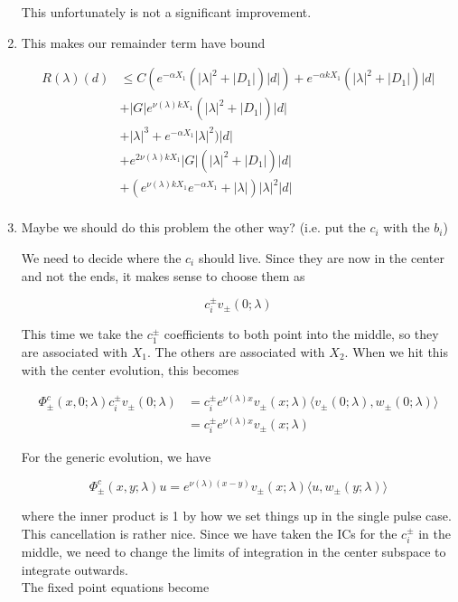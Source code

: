 \documentclass[12pt]{article}
\begin{document}
\begin{enumerate}
This unfortunately is not a significant improvement.


\item This makes our remainder term have bound

\begin{align*}
R(\lambda)(d) &\leq C( e^{-\alpha X_1}( |\lambda|^2 + |D_1|)|d|) + e^{-\alpha k X_1} ( |\lambda|^2 + |D_1|) |d| \\
&+ |G| e^{\nu(\lambda)k X_1} ( |\lambda|^2 + |D_1| )|d| \\ 
&+ |\lambda|^3 + e^{-\alpha X_1} |\lambda|^2 )|d| \\
&+ e^{2 \nu(\lambda) k X_1} |G| ( |\lambda|^2 + |D_1| )|d| \\
&+ (e^{\nu(\lambda)k X_1} e^{-\alpha X_1} + |\lambda|)|\lambda|^2|d|\\
\end{align*}

\item Maybe we should do this problem the other way? (i.e. put the $c_i$ with the $b_i$)

We need to decide where the $c_i$ should live. Since they are now in the center and not the ends, it makes sense to choose them as 

\[
c_i^\pm v_\pm(0; \lambda)
\]

This time we take the $c_1^\pm$ coefficients to both point into the middle, so they are associated with $X_1$. The others are associated with $X_2$. When we hit this with the center evolution, this becomes

\begin{align*}
\Phi^c_\pm(x,0; \lambda)c_i^\pm v_\pm(0; \lambda) &= c_i^\pm e^{\nu(\lambda)x} v_\pm(x; \lambda) \langle v_\pm(0; \lambda), w_\pm(0; \lambda) \rangle \\
&= c_i^\pm e^{\nu(\lambda)x} v_\pm(x; \lambda)
\end{align*}

For the generic evolution, we have

\[
\Phi^c_\pm(x,y; \lambda) u = e^{\nu(\lambda)(x-y)} v_\pm(x; \lambda) \langle u, w_\pm(y; \lambda) \rangle 
\]

where the inner product is 1 by how we set things up in the single pulse case. This cancellation is rather nice. Since we have taken the ICs for the $c_i^\pm$ in the middle, we need to change the limits of integration in the center subspace to integrate outwards.
\\ 

The fixed point equations become


\end{enumerate}
\end{document}
